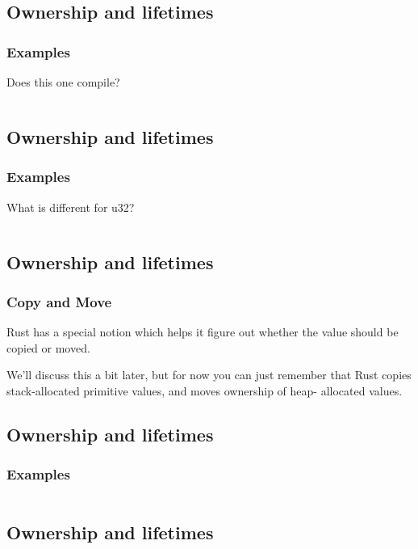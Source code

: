 \documentclass[usenames,twocolumn,dvipsnames,10pt,a4wide]{article}
\begin{document}
	\inputminted[fontsize=\normalsize]{rust}{code/own2.rs}


\subsection{Ownership and lifetimes}
	\subsubsection{Examples}
	Does this one compile?
	
	\inputminted[fontsize=\normalsize]{rust}{code/own3.rs}


\subsection{Ownership and lifetimes}
	\subsubsection{Examples}
	What is different for u32?
	
	\inputminted[fontsize=\normalsize]{rust}{code/own4.rs}


\subsection{Ownership and lifetimes}
	\subsubsection{Copy and Move}
	Rust has a special notion which helps it figure
	out whether the value should be copied or moved.
	
	We'll discuss this a bit later, but for now you	can
	just remember that Rust copies stack-allocated
	primitive values, and moves ownership of heap-
	allocated values.
	


\subsection{Ownership and lifetimes}
	\subsubsection{Examples}
	\inputminted[fontsize=\normalsize]{rust}{code/own5.rs}


\subsection{Ownership and lifetimes}
\end{document}
